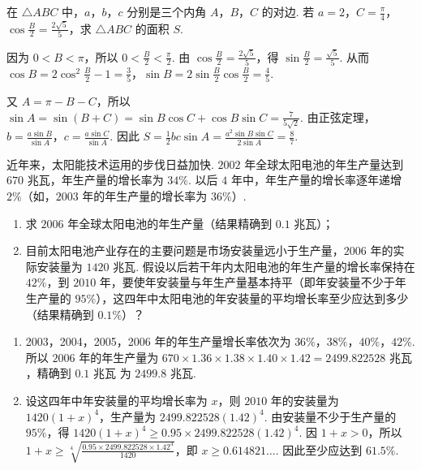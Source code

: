 \begin{problem}
在 \(\triangle ABC\) 中，\(a\)，\(b\)，\(c\) 分别是三个内角 \(A\)，\(B\)，\(C\) 的对边. 若 \(a = 2\)，\(C = \frac{\pi}{4}\)，\(\cos \frac{B}{2} = \frac{2\sqrt{5}}{5}\)，求 \(\triangle ABC\) 的面积 \(S\).
\end{problem}

\begin{solution}
因为 \(0<B<\pi\)，所以 \(0<\frac B2<\frac{\pi}{2}\). 由 \(\cos\frac B2=\frac{2\sqrt5}{5}\)，得 \(\sin\frac B2=\frac{\sqrt5}{5}\). 从而 \(\cos B=2\cos^2\frac B2-1=\frac35\)，\(\sin B=2\sin\frac B2\cos\frac B2=\frac45\).

又 \(A=\pi-B-C\)，所以 \(\sin A=\sin(B+C)=\sin B\cos C+\cos B\sin C=\frac{7}{5\sqrt2}\). 由正弦定理，\(b=\frac{a\sin B}{\sin A}\)，\(c=\frac{a\sin C}{\sin A}\). 因此 \(S=\frac12bc\sin A=\frac{a^2\sin B\sin C}{2\sin A}=\frac{8}{7}\).
\end{solution}

\begin{problem}
近年来，太阳能技术运用的步伐日益加快. \(2002\) 年全球太阳电池的年生产量达到 \(670\text{ 兆瓦}\)，年生产量的增长率为 \(34\%\). 以后 \(4\) 年中，年生产量的增长率逐年递增 \(2\%\)（如，\(2003\) 年的年生产量的增长率为 \(36\%\)）.

\begin{enumerate}
\item 求 \(2006\) 年全球太阳电池的年生产量（结果精确到 \(0.1\text{ 兆瓦}\)）；
\item 目前太阳电池产业存在的主要问题是市场安装量远小于生产量，\(2006\) 年的实际安装量为 \(1420\text{ 兆瓦}\). 假设以后若干年内太阳电池的年生产量的增长率保持在 \(42\%\)，到 \(2010\) 年，要使年安装量与年生产量基本持平（即年安装量不少于年生产量的 \(95\%\)），这四年中太阳电池的年安装量的平均增长率至少应达到多少（结果精确到 \(0.1\%\)）？
\end{enumerate}
\end{problem}

\begin{solution}
\begin{enumerate}
\item 2003，2004，2005，2006 年的年生产量增长率依次为 \(36\%\)，\(38\%\)，\(40\%\)，\(42\%\). 所以 \(2006\) 年的年生产量为 \(670\times1.36\times1.38\times1.40\times1.42=2499.822528\text{ 兆瓦}\)，精确到 \(0.1\text{ 兆瓦}\) 为 \(2499.8\text{ 兆瓦}\).
\item 设这四年中年安装量的平均增长率为 \(x\)，则 \(2010\) 年的安装量为 \(1420(1+x)^4\)，生产量为 \(2499.822528(1.42)^4\). 由安装量不少于生产量的 \(95\%\)，得 \(1420(1+x)^4\geqslant0.95\times2499.822528(1.42)^4\). 因 \(1+x>0\)，所以 \(1+x\geqslant\sqrt[4]{\frac{0.95\times2499.822528\times1.42^4}{1420}}\)，即 \(x\geqslant0.614821\ldots\). 因此至少应达到 \(61.5\%\).
\end{enumerate}
\end{solution}

